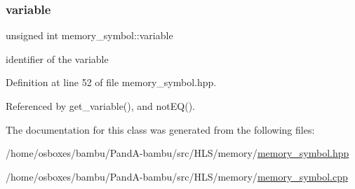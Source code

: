 \subsubsection{\texorpdfstring{variable}{variable}}
{\footnotesize\ttfamily unsigned int memory\+\_\+symbol\+::variable\hspace{0.3cm}{\ttfamily [private]}}



identifier of the variable 



Definition at line 52 of file memory\+\_\+symbol.\+hpp.



Referenced by get\+\_\+variable(), and not\+E\+Q().



The documentation for this class was generated from the following files\+:\begin{DoxyCompactItemize}
\item 
/home/osboxes/bambu/\+Pand\+A-\/bambu/src/\+H\+L\+S/memory/\hyperlink{memory__symbol_8hpp}{memory\+\_\+symbol.\+hpp}\item 
/home/osboxes/bambu/\+Pand\+A-\/bambu/src/\+H\+L\+S/memory/\hyperlink{memory__symbol_8cpp}{memory\+\_\+symbol.\+cpp}\end{DoxyCompactItemize}
